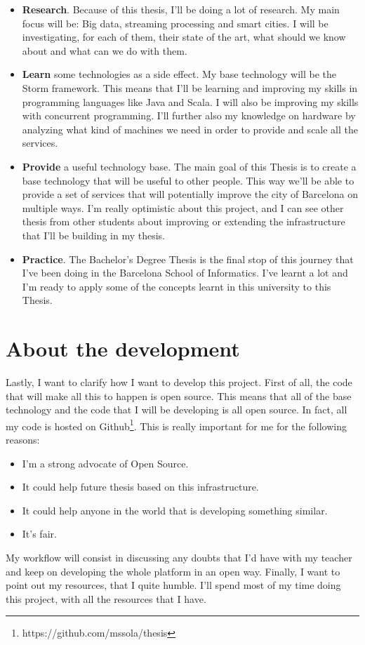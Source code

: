 \documentclass[a4paper,12pt]{article}
\newcommand{\mylist}{
\begin{itemize}
\setlength{\itemsep}{1pt}
\setlength{\parskip}{0pt}
\setlength{\parsep}{0pt}}
\newcommand{\mylistend}{\end{itemize}}
\begin{document}
\mylist
  \item {\bf Research}. Because of this thesis, I'll be doing a lot of
research. My main focus will be: Big data, streaming processing and smart
cities. I will be investigating, for each of them, their state of the art, what
should we know about and what can we do with them.
  \item {\bf Learn} some technologies as a side effect. My base technology will
be the Storm framework. This means that I'll be learning and improving my
skills in programming languages like Java and Scala. I will also be improving my
skills with concurrent programming. I'll further also my knowledge on hardware
by analyzing what kind of machines we need in order to provide and scale all the
services.
  \item {\bf Provide} a useful technology base. The main goal of this Thesis is
to create a base technology that will be useful to other people. This way we'll
be able to provide a set of services that will potentially improve the city of
Barcelona on multiple ways. I'm really optimistic about this project, and I can
see other thesis from other students about improving or extending the
infrastructure that I'll be building in my thesis.
  \item {\bf Practice}. The Bachelor's Degree Thesis is the final stop of this
journey that I've been doing in the Barcelona School of Informatics. I've
learnt a lot and I'm ready to apply some of the concepts learnt in this
university to this Thesis.

\mylistend

\section*{About the development}

Lastly, I want to clarify how I want to develop this project. First of all, the
code that will make all this to happen is open source. This means that all of
the base technology and the code that I will be developing is all open source.
In fact, all my code is hosted on
Github\footnote{https://github.com/mssola/thesis}. This is really important for
me for the following reasons:

\mylist
  \item I'm a strong advocate of Open Source.
  \item It could help future thesis based on this infrastructure.
  \item It could help anyone in the world that is developing something similar.
  \item It's fair.
\mylistend

My workflow will consist in discussing any doubts that I'd have with my teacher
and keep on developing the whole platform in an open way. Finally, I want to
point out my resources, that I quite humble. I'll spend most of my time doing
this project, with all the resources that I have.
\end{document}
